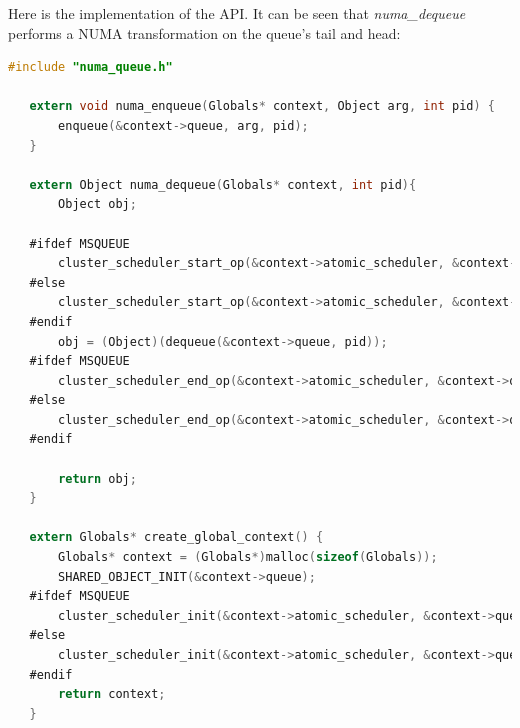 \documentclass{article}
\begin{document}
 Here is the implementation of the API. It can be seen that \textit{numa\_dequeue} performs a NUMA transformation on the queue's tail and head:

 \begin{lstlisting}[language=C]
   #include "numa_queue.h"
   
   extern void numa_enqueue(Globals* context, Object arg, int pid) {
       enqueue(&context->queue, arg, pid);
   }
   
   extern Object numa_dequeue(Globals* context, int pid){
       Object obj;
   
   #ifdef MSQUEUE
       cluster_scheduler_start_op(&context->atomic_scheduler, &context->queue.Head);
   #else
       cluster_scheduler_start_op(&context->atomic_scheduler, &context->queue.Head->head);
   #endif
       obj = (Object)(dequeue(&context->queue, pid));
   #ifdef MSQUEUE
       cluster_scheduler_end_op(&context->atomic_scheduler, &context->queue.Tail);
   #else
       cluster_scheduler_end_op(&context->atomic_scheduler, &context->queue.Tail->tail);
   #endif
       
       return obj;
   }
   
   extern Globals* create_global_context() {
       Globals* context = (Globals*)malloc(sizeof(Globals));
       SHARED_OBJECT_INIT(&context->queue);
   #ifdef MSQUEUE
       cluster_scheduler_init(&context->atomic_scheduler, &context->queue.Head, &context->queue.Tail);
   #else
       cluster_scheduler_init(&context->atomic_scheduler, &context->queue.Head->head, &context->queue.Tail->tail);
   #endif
       return context;
   }
 \end{lstlisting}
\end{document}
